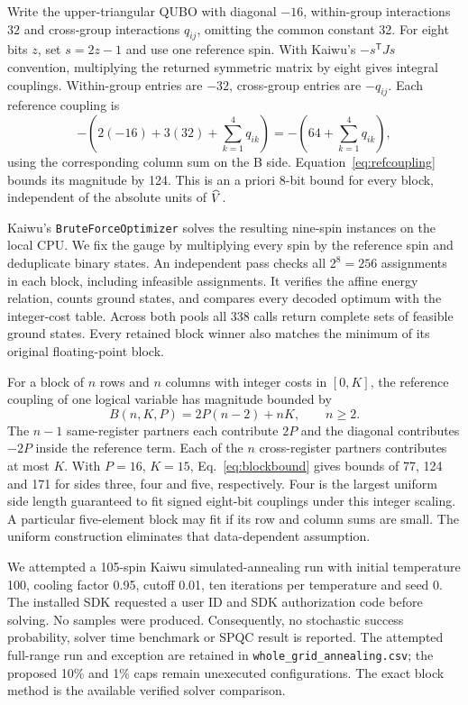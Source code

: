 Write the upper-triangular QUBO with diagonal $-16$, within-group interactions $32$ and cross-group interactions $q_{ij}$, omitting the common constant 32. For eight bits $z$, set $s=2z-1$ and use one reference spin. With Kaiwu's $-s^\mathsf{T}Js$ convention, multiplying the returned symmetric matrix by eight gives integral couplings. Within-group entries are $-32$, cross-group entries are $-q_{ij}$. Each reference coupling is
\begin{equation}
 -\left(2(-16)+3(32)+\sum_{k=1}^4 q_{ik}\right)
 =-\left(64+\sum_{k=1}^4 q_{ik}\right), \label{eq:refcoupling}
\end{equation}
using the corresponding column sum on the B side. Equation~\eqref{eq:refcoupling} bounds its magnitude by 124. This is an a priori 8-bit bound for every block, independent of the absolute units of $\widehat V$.

Kaiwu's \texttt{BruteForceOptimizer} solves the resulting nine-spin instances on the local CPU. We fix the gauge by multiplying every spin by the reference spin and deduplicate binary states. An independent pass checks all $2^8=256$ assignments in each block, including infeasible assignments. It verifies the affine energy relation, counts ground states, and compares every decoded optimum with the integer-cost table. Across both pools all 338 calls return complete sets of feasible ground states. Every retained block winner also matches the minimum of its original floating-point block.

For a block of $n$ rows and $n$ columns with integer costs in $[0,K]$, the reference coupling of one logical variable has magnitude bounded by
\begin{equation}
 B(n,K,P)=2P(n-2)+nK,\qquad n\geq2.
 \label{eq:blockbound}
\end{equation}
The $n-1$ same-register partners each contribute $2P$ and the diagonal contributes $-2P$ inside the reference term. Each of the $n$ cross-register partners contributes at most $K$. With $P=16$, $K=15$, Eq.~\eqref{eq:blockbound} gives bounds of 77, 124 and 171 for sides three, four and five, respectively. Four is the largest uniform side length guaranteed to fit signed eight-bit couplings under this integer scaling. A particular five-element block may fit if its row and column sums are small. The uniform construction eliminates that data-dependent assumption.

We attempted a 105-spin Kaiwu simulated-annealing run with initial temperature 100, cooling factor 0.95, cutoff 0.01, ten iterations per temperature and seed 0. The installed SDK requested a user ID and SDK authorization code before solving. No samples were produced. Consequently, no stochastic success probability, solver time benchmark or SPQC result is reported. The attempted full-range run and exception are retained in \texttt{whole\_grid\_annealing.csv}; the proposed 10\% and 1\% caps remain unexecuted configurations. The exact block method is the available verified solver comparison.

